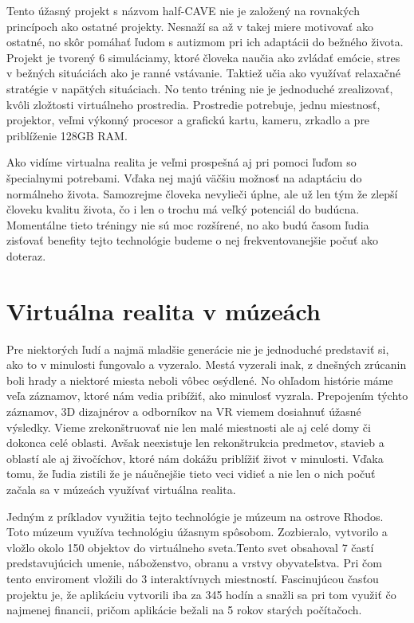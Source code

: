 \documentclass[10pt,twoside,slovak,a4paper]{article}
\begin{document}
Tento úžasný projekt s názvom half-CAVE nie je založený na rovnakých princípoch ako ostatné projekty. Nesnaží sa až v takej miere motivovať ako ostatné, no skôr pomáhať ľudom s autizmom pri ich adaptácii do bežného života. Projekt je tvorený 6 simuláciamy, ktoré človeka naučia ako zvládať emócie, stres v bežných situáciách ako je ranné vstávanie. Taktiež učia ako využívať relaxačné stratégie v napätých situáciach. No tento tréning nie je jednoduché zrealizovať, kvôli zložtosti virtuálneho prostredia. Prostredie potrebuje, jednu miestnosť, projektor, veľmi výkonný procesor a grafickú kartu, kameru, zrkadlo a pre priblíženie 128GB RAM.~\cite{Autism}

Ako vidíme virtualna realita je veľmi prospešná aj pri pomoci ľuďom so špecialnymi potrebami. Vďaka nej majú väčšiu možnosť na adaptáciu do normálneho života. Samozrejme človeka nevylieči úplne, ale už len tým že zlepší človeku kvalitu života, čo i len o trochu má veľký potenciál do budúcna. Momentálne tieto tréningy nie sú moc rozšírené, no ako budú časom ľudia zisťovať benefity tejto technológie budeme o nej frekventovanejšie počuť ako doteraz.   

\section{Virtuálna realita v múzeách} \label{muzea}
Pre niektorých ľudí a najmä mladšie generácie nie je jednoduché predstaviť si, ako to v minulosti fungovalo a vyzeralo. Mestá vyzerali inak, z dnešných zrúcanin boli hrady a niektoré miesta neboli vôbec osýdlené. No ohľadom histórie máme veľa záznamov, ktoré nám vedia pribížiť, ako minulosť vyzrala. Prepojením týchto záznamov, 3D dizajnérov a odborníkov na VR viemem dosiahnuť úžasné výsledky. Vieme zrekonštruovať nie len malé miestnosti ale aj celé domy či dokonca celé oblasti. Avšak neexistuje len rekonštrukcia predmetov, stavieb a oblastí ale aj živočíchov, ktoré nám dokážu priblížiť život v minulosti. Vďaka tomu, že ľudia zistili že je náučnejšie tieto veci vidieť a nie len o nich počuť začala sa v múzeách využívať virtuálna realita.

Jedným z príkladov využitia tejto technológie je múzeum na ostrove Rhodos. Toto múzeum využíva technológiu úžasnym spôsobom. Zozbieralo, vytvorilo a vložlo okolo 150 objektov do virtuálneho sveta.Tento svet obsahoval 7 častí predstavujúcich umenie, náboženstvo, obranu a vrstvy obyvateľstva. Pri čom tento enviroment vložili do 3 interaktívnych miestností. Fascinujúcou časťou projektu je, že aplikáciu vytvorili iba za 345 hodín a snažli sa pri tom využiť čo najmenej financii, pričom aplikácie bežali na 5 rokov starých počítačoch.~\cite{Muzeum}
\end{document}
